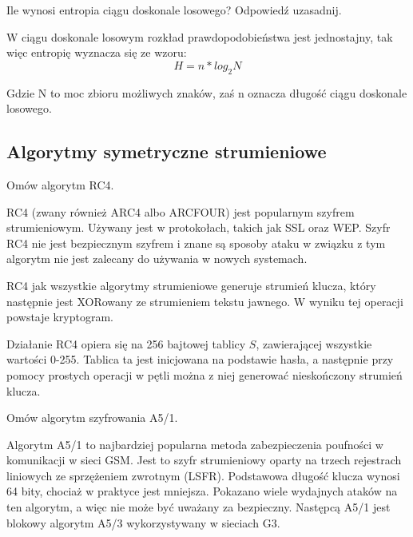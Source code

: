 \documentclass[answers,11pt]{exam}
\begin{document}
\begin{questions}
\begin{solution}
\end{solution}

\question Ile wynosi entropia ciągu doskonale losowego? Odpowiedź uzasadnij.
\begin{solution}
W ciągu doskonale losowym rozkład prawdopodobieństwa jest jednostajny, tak więc entropię wyznacza się ze wzoru:
\begin{equation}
H = n * log_2 N
\end{equation}

Gdzie N to moc zbioru możliwych znaków, zaś n oznacza długość ciągu doskonale losowego.
\end{solution}
\end{questions}

\subsection{Algorytmy symetryczne strumieniowe}
\begin{questions}

\question Omów algorytm RC4.
\begin{solution}
RC4 (zwany również ARC4 albo ARCFOUR) jest popularnym szyfrem strumieniowym. Używany jest w protokołach, takich jak SSL oraz WEP. Szyfr RC4 nie jest bezpiecznym szyfrem i znane są sposoby ataku w związku z tym algorytm nie jest zalecany do używania w nowych systemach.

RC4 jak wszystkie algorytmy strumieniowe generuje strumień klucza, który następnie jest XORowany ze strumieniem tekstu jawnego. W wyniku tej operacji powstaje kryptogram.

Działanie RC4 opiera się na 256 bajtowej tablicy $S$, zawierającej wszystkie wartości 0-255. Tablica ta jest inicjowana na podstawie hasła, a następnie przy pomocy prostych operacji w pętli można z niej generować nieskończony strumień klucza. 
\end{solution}

\question Omów algorytm szyfrowania A5/1.
\begin{solution}
Algorytm A5/1 to najbardziej popularna metoda zabezpieczenia poufności w komunikacji w sieci GSM. Jest to szyfr strumieniowy oparty na trzech rejestrach liniowych ze sprzężeniem zwrotnym (LSFR). Podstawowa długość klucza wynosi 64 bity, chociaż w praktyce jest mniejsza. Pokazano wiele wydajnych ataków na ten algorytm, a więc nie może być uważany za bezpieczny. Następcą A5/1 jest blokowy algorytm A5/3 wykorzystywany w sieciach G3.
\end{solution}

\end{questions}
\end{document}
